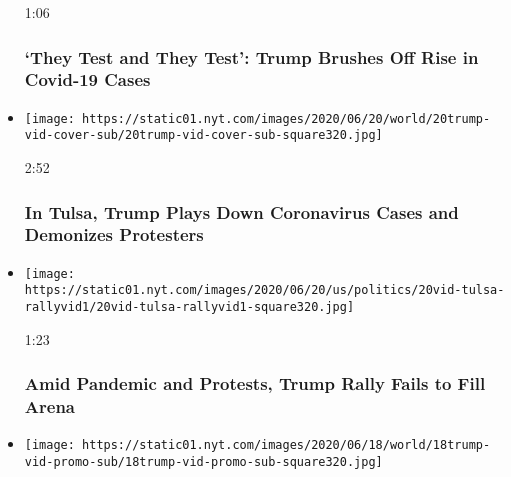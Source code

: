 \begin{itemize}
  1:06

  \hypertarget{they-test-and-they-test-trump-brushes-off-rise-in-covid-19-cases}{%
  \subsubsection{`They Test and They Test': Trump Brushes Off Rise in
  Covid-19
  Cases}\label{they-test-and-they-test-trump-brushes-off-rise-in-covid-19-cases}}
\item
  \href{https://www.nytimes.com/video/us/politics/100000007202247/trump-tulsa-rally.html?action=click\&module=video-series-bar\&region=header\&pgtype=Article\&playlistId=video/2020-Elections}{}

  \texttt{[image: https://static01.nyt.com/images/2020/06/20/world/20trump-vid-cover-sub/20trump-vid-cover-sub-square320.jpg]}

  2:52

  \hypertarget{in-tulsa-trump-plays-down-coronavirus-cases-and-demonizes-protesters}{%
  \subsubsection{In Tulsa, Trump Plays Down Coronavirus Cases and
  Demonizes
  Protesters}\label{in-tulsa-trump-plays-down-coronavirus-cases-and-demonizes-protesters}}
\item
  \href{https://www.nytimes.com/video/us/politics/100000007201990/trump-supporters-gather-in-tulsa-for-rally.html?action=click\&module=video-series-bar\&region=header\&pgtype=Article\&playlistId=video/2020-Elections}{}

  \texttt{[image: https://static01.nyt.com/images/2020/06/20/us/politics/20vid-tulsa-rallyvid1/20vid-tulsa-rallyvid1-square320.jpg]}

  1:23

  \hypertarget{amid-pandemic-and-protests-trump-rally-fails-to-fill-arena}{%
  \subsubsection{Amid Pandemic and Protests, Trump Rally Fails to Fill
  Arena}\label{amid-pandemic-and-protests-trump-rally-fails-to-fill-arena}}
\item
  \href{https://www.nytimes.com/video/us/politics/100000007199618/trump-tulsa-rally-supporters-coronavirus.html?action=click\&module=video-series-bar\&region=header\&pgtype=Article\&playlistId=video/2020-Elections}{}

  \texttt{[image: https://static01.nyt.com/images/2020/06/18/world/18trump-vid-promo-sub/18trump-vid-promo-sub-square320.jpg]}


\end{itemize}
